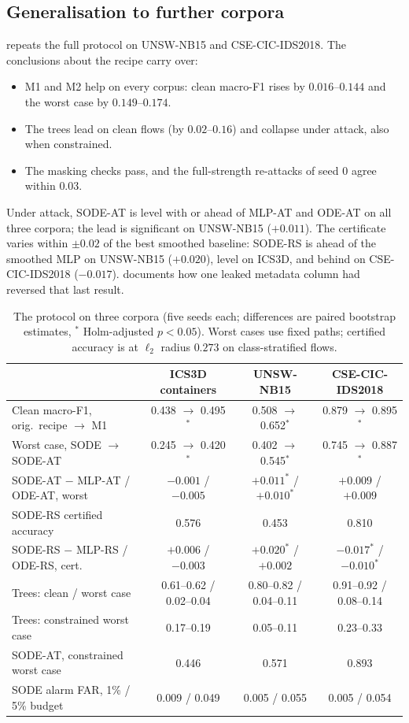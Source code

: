 \documentclass{article}
\theoremstyle{definition}
\begin{document}
\subsection{Generalisation to further corpora}
 repeats the full protocol on UNSW-NB15 and
CSE-CIC-IDS2018. The conclusions about the recipe carry over:
\begin{itemize}
\item M1 and M2 help on every corpus: clean macro-F1 rises by $0.016$--$0.144$ and
the worst case by $0.149$--$0.174$.
\item The trees lead on clean flows (by $0.02$--$0.16$) and collapse under attack,
also when constrained.
\item The masking checks pass, and the full-strength re-attacks of seed 0 agree
within $0.03$.
\end{itemize}
Under attack, SODE-AT is level with or ahead of MLP-AT and ODE-AT on all three
corpora; the lead is significant on UNSW-NB15 ($+0.011$). The certificate
varies within $\pm0.02$ of the best smoothed baseline: SODE-RS is ahead of the
smoothed MLP on UNSW-NB15 ($+0.020$), level on ICS3D, and behind on
CSE-CIC-IDS2018 ($-0.017$).  documents how one leaked metadata
column had reversed that last result.

\begin{table}[t]
\caption{The protocol on three corpora (five seeds each; differences are paired
bootstrap estimates, $^{*}$ Holm-adjusted $p<0.05$). Worst cases use fixed paths;
certified accuracy is at $\ell_2$ radius $0.273$ on class-stratified flows.}
\label{tab:generalisation}
\centering\scriptsize
\setlength{\tabcolsep}{3pt}
\begin{tabular}{lccc}
\toprule
& ICS3D containers & UNSW-NB15 & CSE-CIC-IDS2018\\
\midrule
Clean macro-F1, orig.\ recipe $\to$ M1 & 0.438 $\to$ 0.495$^{*}$ & 0.508 $\to$ 0.652$^{*}$ & 0.879 $\to$ 0.895$^{*}$\\
Worst case, SODE $\to$ SODE-AT & 0.245 $\to$ 0.420$^{*}$ & 0.402 $\to$ 0.545$^{*}$ & 0.745 $\to$ 0.887$^{*}$\\
SODE-AT $-$ MLP-AT / ODE-AT, worst & $-0.001$ / $-0.005$ & $+0.011^{*}$ / $+0.010^{*}$ & $+0.009$ / $+0.009$\\
SODE-RS certified accuracy & 0.576 & 0.453 & 0.810\\
SODE-RS $-$ MLP-RS / ODE-RS, cert. & $+0.006$ / $-0.003$ & $+0.020^{*}$ / $+0.002$ & $-0.017^{*}$ / $-0.010^{*}$\\
Trees: clean / worst case & 0.61--0.62 / 0.02--0.04 & 0.80--0.82 / 0.04--0.11 & 0.91--0.92 / 0.08--0.14\\
Trees: constrained worst case & 0.17--0.19 & 0.05--0.11 & 0.23--0.33\\
SODE-AT, constrained worst case & 0.446 & 0.571 & 0.893\\
SODE alarm FAR, 1\% / 5\% budget & 0.009 / 0.049 & 0.005 / 0.055 & 0.005 / 0.054\\
\bottomrule
\end{tabular}
\end{table}
\end{document}
